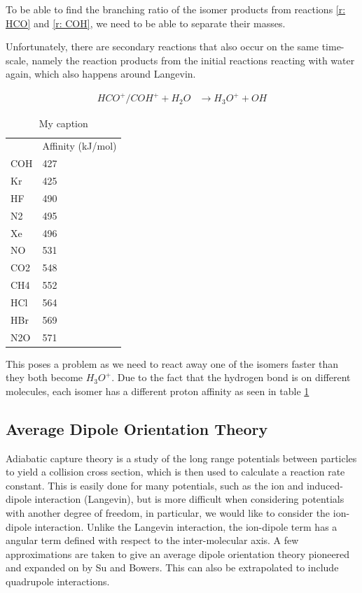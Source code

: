 \documentclass[a4paper]{article}
\begin{document}
To be able to find the branching ratio of the isomer products from reactions \ref{r: HCO} and \ref{r: COH}, we need to be able to separate their masses. 

Unfortunately, there are secondary reactions that also occur on the same time-scale, namely the reaction products from the initial reactions reacting with water again, which also happens around Langevin.

\begin{align}
HCO^+/COH^+ + H_2O &\rightarrow H_3O^+ + OH \label{r: c2}
\end{align}

\begin{table}
\centering
\caption{My caption}
\label{t: affinities}
\begin{tabular}{ll}
    & Affinity (kJ/mol) \\
COH & 427               \\
Kr  & 425               \\
HF  & 490               \\
N2  & 495               \\
Xe  & 496               \\
NO  & 531               \\
CO2 & 548               \\
CH4 & 552               \\
HCl & 564               \\
HBr & 569               \\
N2O & 571              
\end{tabular}
\end{table}

This poses a problem as we need to react away one of the isomers faster than they both become $H_3O^+$. Due to the fact that the hydrogen bond is on different molecules, each isomer has a different proton affinity as seen in table \ref{t: affinities} \cite{Love1987TheAffinity}

\subsection{Average Dipole Orientation Theory}

Adiabatic capture theory is a study of the long range potentials between particles to yield a collision cross section, which is then used to calculate a reaction rate constant. This is easily done for many potentials, such as the ion and induced-dipole interaction (Langevin), but is more difficult when considering potentials with another degree of freedom, in particular, we would like to consider the ion-dipole interaction. Unlike the Langevin interaction, the ion-dipole term has a angular term defined with respect to the inter-molecular axis. A few approximations are taken to give an average dipole orientation theory pioneered and expanded on by Su and Bowers.\cite{Su1973, Su1973a} This can also be extrapolated to include quadrupole interactions.\cite{Su1975}
\end{document}
